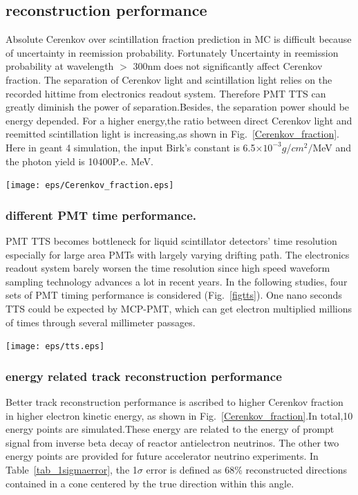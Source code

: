 \documentclass[a4paper,10pt]{cpc-hepnp}
\begin{document}
\subsection{reconstruction performance}
Absolute Cerenkov over scintillation fraction prediction in MC is difficult because of uncertainty in reemission probability.
Fortunately Uncertainty  in  reemission  probability  at  wavelength $>$ 300nm does not significantly affect Cerenkov fraction\cite{DocDB9847}.
The separation of Cerenkov light and scintillation light relies on the recorded hittime from electronics readout system.
Therefore PMT TTS can greatly diminish the power of separation.Besides, the separation power should be energy depended.
For a higher energy,the ratio between direct Cerenkov light and reemitted scintillation light is increasing,as shown in Fig.~\ref{Cerenkov_fraction}.
Here in geant 4 simulation, the input Birk's constant is 6.5$\times10^{-3}g$/$cm^{2}$$/$MeV and the photon yield
is 10400P.e. \/MeV.
\begin{center}
\texttt{[image: eps/Cerenkov\_fraction.eps]}
\end{center}
\subsubsection{different PMT time performance.}
PMT TTS becomes bottleneck for liquid scintillator detectors' time resolution especially for large area
PMTs with largely varying drifting path. The electronics readout system barely worsen the time resolution
since high speed waveform sampling technology advances a lot in recent years. In the following studies, four sets of
PMT timing performance is considered  (Fig.~\ref{figtts}). One nano seconds TTS could be expected by MCP-PMT,
which can get electron multiplied
millions of times through several millimeter passages.

\begin{center}
\texttt{[image: eps/tts.eps]}
\end{center}

\subsubsection{energy related track reconstruction performance}
Better track reconstruction performance is ascribed to higher Cerenkov fraction in higher electron kinetic energy,
as shown in Fig.~\ref{Cerenkov_fraction}.In total,10 energy points are simulated.These energy are related to the
energy of prompt signal
from inverse beta decay of reactor antielectron neutrinos. The other two  energy points are provided for future
accelerator neutrino experiments. In  Table~\ref{tab_1sigmaerror}, the 1$\sigma$ error is defined as 68\% reconstructed directions
contained in a cone centered by the true direction within this angle.
\end{document}
